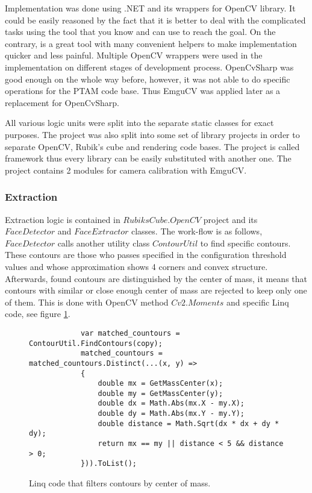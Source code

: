 \documentclass[../../main.tex]{subfiles}
\begin{document}
Implementation was done using .NET {\Csharp} and its wrappers for \ac{OpenCV} library. It could be easily reasoned by the fact that it is better to deal with the complicated tasks using the tool that you know and can use to reach the goal. On the contrary, {\Csharp} is a great tool with many convenient helpers to make implementation quicker and less painful.
Multiple \ac{OpenCV} wrappers were used in the implementation on different stages of development process. OpenCvSharp was good enough on the whole way before, however, it was not able to do specific operations for the \ac{PTAM} code base. Thus \ac{EmguCV} was applied later as a replacement for OpenCvSharp.

All various logic units were split into the separate static classes for exact purposes. The project was also split into some set of library projects in order to separate \ac{OpenCV}, Rubik's cube and rendering code bases. The project is called framework thus every library can be easily substituted with another one. The project contains 2 modules for camera calibration with \ac{EmguCV}.

\subsubsection*{Extraction}

Extraction logic is contained in $RubiksCube.OpenCV$ project and its $FaceDetector$ and $FaceExtractor$ classes. The work-flow is as follows, $FaceDetector$ calls another utility class $ContourUtil$ to find specific contours. These contours are those who passes specified in the configuration threshold values and whose approximation shows 4 corners and convex structure. Afterwards, found contours are distinguished by the center of mass, it means that contours with similar or close enough center of mass are rejected to keep only one of them. This is done with \ac{OpenCV} method $Cv2.Moments$ and specific {\Csharp} \ac{Linq} code, see figure \ref{fig:impl_filtering_contours}.

\begin{figure} [!ht]
  \centering    
    \lstset{style=sharpc}
        \begin{lstlisting}
            var matched_countours = ContourUtil.FindContours(copy);
            matched_countours = matched_countours.Distinct(...(x, y) =>
            {
                double mx = GetMassCenter(x);
                double my = GetMassCenter(y);
                double dx = Math.Abs(mx.X - my.X);
                double dy = Math.Abs(mx.Y - my.Y);
                double distance = Math.Sqrt(dx * dx + dy * dy);
                return mx == my || distance < 5 && distance > 0;
            })).ToList();
        \end{lstlisting}
  \caption{Linq code that filters contours by center of mass.}
  \label{fig:impl_filtering_contours}
\end{figure}
\end{document}
